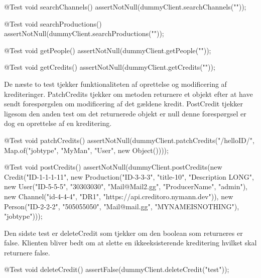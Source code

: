 \begin{code}[caption=DummyClientTest.java, firstnumber=31]
@Test
void searchChannels() {
    assertNotNull(dummyClient.searchChannels(""));
}

@Test
void searchProductions() {
    assertNotNull(dummyClient.searchProductions(""));
}

@Test
void getPeople() {
    assertNotNull(dummyClient.getPeople(""));
}

@Test
void getCredits() {
    assertNotNull(dummyClient.getCredits(""));
}
\end{code}

De næste to test tjekker funktionaliteten af oprettelse og modificering af krediteringer. PatchCredits tjekker om metoden returnere et objekt efter at have sendt forespørgslen om modificering af det gældene kredit. PostCredit tjekker ligesom den anden test om det returnerede objekt er null denne forespørgsel er dog en oprettelse af en kreditering.

\begin{code}[caption=DummyClientTest.java, firstnumber=51]
@Test
void patchCredits() {
    assertNotNull(dummyClient.patchCredits("/helloID/", Map.of("jobtype", "MyMan", "User", new Object())));
}

@Test
void postCredits() {
    assertNotNull(dummyClient.postCredits(new Credit("ID-1-1-1-11",
            new Production("ID-3-3-3", "title-10", "Description LONG",
                    new User("ID-5-5-5", "30303030", "Mail@Mail2.gg", "ProducerName", "admin"),
                    new Channel("id-4-4-4", "DR1", "https://api.creditoro.nymann.dev")),
            new Person("ID-2-2-2", "505055050", "Mail@mail.gg", "MYNAMEISNOTHING"),
            "jobtype")));
}
\end{code}

Den sidste test er deleteCredit som tjekker om den boolean som returneres er false. Klienten bliver bedt om at slette en ikkeeksisterende kreditering hvilket skal returnere false.  

\begin{code}[caption=DummyClientTest.java, firstnumber=66]
@Test
void deleteCredit() {
    assertFalse(dummyClient.deleteCredit("test"));
}
\end{code}